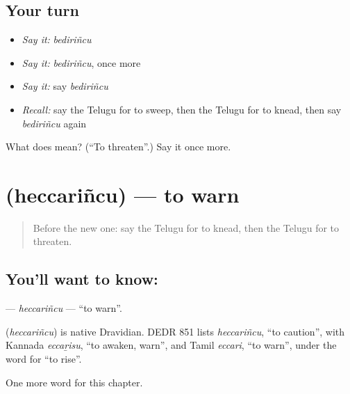 \subsection*{Your turn}
\begin{itemize}
\raggedright
  \item \emph{Say it:} \emph{bediriñcu}
  \item \emph{Say it:} \emph{bediriñcu}, once more
  \item \emph{Say it:} say \emph{bediriñcu}
  \item \emph{Recall:} say the Telugu for to sweep, then the Telugu for to knead, then say \emph{bediriñcu} again
\end{itemize}

\begin{tcolorbox}[breakable,colback=teal!4,colframe=teal!35!black,title={Before you move on}]
What does  mean? (\textquotedblleft{}To threaten\textquotedblright{}.) Say it once more.
\end{tcolorbox}
\section[\texorpdfstring{\te{హెచ్చరించు} (heccariñcu)}{హెచ్చరించు (heccariñcu)}]{ (heccariñcu) — to warn}

\label{lesson:TE-C285-heccarincu}



\begin{quote}
Before the new one: say the Telugu for to knead, then the Telugu for to threaten.
\end{quote}

\subsection*{You'll want to know: }
\textbf{} — \emph{heccariñcu} — \textquotedblleft{}to warn\textquotedblright{}.

\begin{cousinweb}
\textbf{} (\emph{heccariñcu}) is native Dravidian. DEDR 851 lists \emph{heccariñcu}, \textquotedblleft{}to caution\textquotedblright{}, with Kannada \emph{eccaṟisu}, \textquotedblleft{}to awaken, warn\textquotedblright{}, and Tamil \emph{eccari}, \textquotedblleft{}to warn\textquotedblright{}, under the word for \textquotedblleft{}to rise\textquotedblright{}.
\end{cousinweb}

\begin{grammarlens}[title={What you've built}]
One more word for this chapter.
\end{grammarlens}

